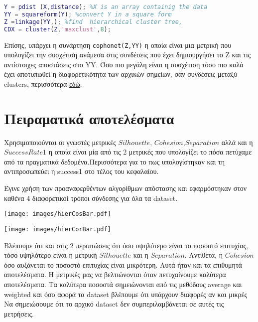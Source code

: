 \begin{lstlisting}[language=Matlab]
%simple example of hierarchical clustering
Y = pdist (X,distance); %X is an array containig the data
YY = squareform(Y); %convert Y in a square form
Z =linkage(YY,); %find  hierarchical cluster tree,
CDX = cluster(Z,'maxclust',8);
\end{lstlisting}

Επίσης, υπάρχει η συνάρτηση \lstinline!cophonet(Z,YY)! η οποία είναι μια μετρική που υπολογίζει την συσχέτιση ανάμεσα στις συνδέσεις που έχει δημιουργήσει το Z και τις αντίστοιχες αποστάσεις στο YY.
Όσο πιο μεγάλη είναι η συσχέτιση τόσο πιο καλά έχει αποτυπωθεί η διαφορετικότητα των αρχικών σημείων, σαν συνδέσεις μεταξύ clusters, περισσότερα
\href{https://en.wikipedia.org/wiki/Cophenetic_correlation}{εδώ}.

\section{Πειραματικά αποτελέσματα}
Χρησιμοποιούνται οι γνωστές μετρικές $Silhouette$, $Cohesion$,$Separation$
αλλά και η $Success Rate 1$ η οποία είναι μία από τις 2 μετρικές που  υπολογίζει το πόσα πετύχαμε από τα πραγματικά δεδομένα.Περισσότερα για το πως υπολογίστηκαν και τη αντιπροσωπεύει η success1 στο τέλος του κεφαλαίου.    

Έγινε χρήση των προαναφερθέντων αλγορίθμων απόστασης και εφαρμόστηκαν στον καθένα 4 διαφορετικοί τρόποι σύνδεσης για όλα τα dataset.

\noindent\begin{minipage}{\linewidth}
    \centering
    \texttt{[image: images/hierCosBar.pdf]}
    \label{fig:CosineHier}
\end{minipage}

\noindent\begin{minipage}{\linewidth}
    \centering
    \texttt{[image: images/hierCorBar.pdf]}
    \label{fig:hierCorBar}
\end{minipage}

Βλέπουμε ότι και στις 2 περιπτώσεις ότι όσο υψηλότερο είναι το ποσοστό επιτυχίας,
τόσο υψηλότερο είναι η μετρική $Silhouette$ και η $Separation$.
Αντίθετα, η $Cohesion$ όσο αυξάνεται το ποσοστό επιτυχίας είναι μικρότερη.
Αυτά ήταν και τα επιθυμητά αποτελέσματα.
Η μετρικές μας να βελτιώνονται όταν πετυχαίνουμε καλύτερα αποτελέσματα. 
Τα καλύτερα ποσοστά σημειώνονται από τις μεθόδους average και weighted
και όσο αφορά τα dataset βλέπουμε ότι υπάρχουν διαφορές αν και μικρές
Να σημειώσουμε ότι το αρχικό dataset δεν συμπεριλαμβάνεται σε αυτές τις μετρήσεις.

